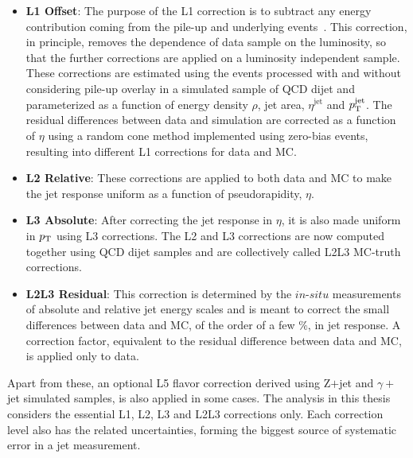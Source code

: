 \begin{itemize}[leftmargin=*]
\item {\bf{L1 Offset}}: The purpose of the L1 correction is to subtract any energy contribution coming from the pile-up and underlying events~\cite{Cacciari:2007fd}.
  This correction, in principle, removes the dependence of data sample on the luminosity, so that the further corrections are applied on a
  luminosity independent sample. These corrections are estimated using the events processed with and without considering pile-up overlay in a simulated
  sample of QCD dijet and parameterized as a function of energy density $\rho$, jet area, $\eta^{\textrm{jet}}$ and $p_{\mathrm T}^{\textrm{jet}}$. The residual differences between
  data and simulation are corrected as a function of $\eta$ using a random cone method implemented using zero-bias events, resulting into different L1 corrections for
  data and MC.
\item {\bf{L2 Relative}}: These corrections are applied to both data and MC to make the jet response uniform as a function of pseudorapidity, $\eta$.
\item {\bf{L3 Absolute}}: After correcting the jet response in $\eta$, it is also made uniform in $p_{\mathrm T}$ using L3 corrections. The L2 and L3 corrections are now
  computed together using QCD dijet samples and are collectively called L2L3 MC-truth corrections.
\item {\bf{L2L3 Residual}}: This correction is determined by the $\textit{in-situ}$ measurements of absolute and relative jet energy scales and is meant to
  correct the small differences between data and MC, of the order of a few $\%$, in jet response. A correction factor, equivalent to the residual difference
  between data and MC, is applied only to data. 
\end{itemize}
Apart from these, an optional L5 flavor correction derived using Z$+$jet and $\gamma+$jet simulated samples, is also applied in some cases. The analysis in this thesis
considers the essential L1, L2, L3 and L2L3 corrections only. Each correction level also has the related uncertainties, forming the biggest source of systematic error
in a jet measurement. 
